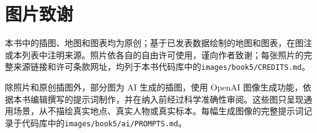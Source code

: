 \chapter*{图片致谢}

本书中的插图、地图和图表均为原创；基于已发表数据绘制的地图和图表，在图注或本列表中注明来源。照片依各自的自由许可使用，谨向作者致谢；每张照片的完整来源链接和许可条款网址，均列于本书代码库中的\texttt{images/book5/CREDITS.md}。

\bigskip
除照片和原创插图外，部分图为 AI 生成的插图，使用 OpenAI 图像生成功能，依据本书编辑撰写的提示词制作，并在纳入前经过科学准确性审阅。这些图只呈现通用场景，从不描绘真实地点、真实人物或真实标本。每幅生成图像的完整提示词记录于代码库中的\texttt{images/book5/ai/PROMPTS.md}。


